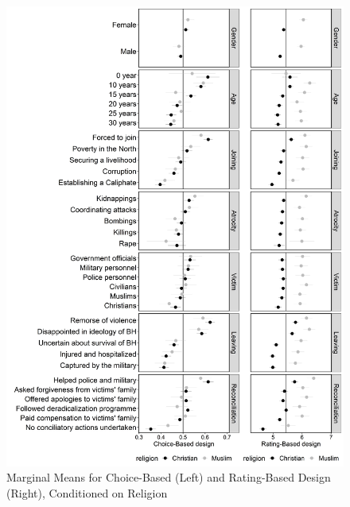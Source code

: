 \begin{figure}[H]
\includegraphics[width=\textwidth]{Chapter_3/art2-figure4.jpeg}
\caption{Marginal Means for Choice-Based (Left) and Rating-Based Design (Right), Conditioned on Religion}
\label{fig:art2-fig4}    
\end{figure}


